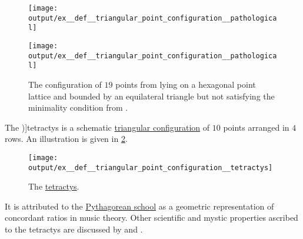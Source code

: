 \begin{example}
\begin{thmenum}
    \begin{figure}[!ht]
      \begin{subcaptionblock}{0.45\textwidth}
        \centering
        \texttt{[image: output/ex\_\_def\_\_triangular\_point\_configuration\_\_pathological]}
      \end{subcaptionblock}
      \hfill
      \begin{subcaptionblock}{0.45\textwidth}
        \centering
        \texttt{[image: output/ex\_\_def\_\_triangular\_point\_configuration\_\_pathological]}
      \end{subcaptionblock}
      \caption{The configuration of \( 19 \) points from  lying on a hexagonal point lattice and bounded by an equilateral triangle but not satisfying the minimality condition from .}\label{fig:ex:def:triangular_point_configuration/pathological}
    \end{figure}

     The \term[ru=тетрактида (\cite[99]{Жмудь1990Пифагор})]{tetractys} is a schematic \hyperref[def:triangular_point_configuration]{triangular configuration} of \( 10 \) points arranged in \( 4 \) rows. An illustration is given in \cref{fig:ex:def:triangular_point_configuration/tetractys}.

    \begin{figure}[!ht]
      \centering
      \texttt{[image: output/ex\_\_def\_\_triangular\_point\_configuration\_\_tetractys]}
      \caption{The \hyperref[ex:def:triangular_point_configuration/tetractys]{tetractys}.}\label{fig:ex:def:triangular_point_configuration/tetractys}
    \end{figure}

    It is attributed to the \hyperref[ex:pythagoreanism]{Pythagorean school} as a geometric representation of concordant ratios in music theory. Other scientific and mystic properties ascribed to the tetractys are discussed  by  and .
  \end{thmenum}
\end{example}

